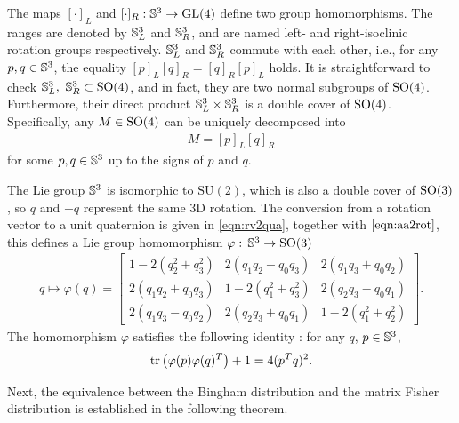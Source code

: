 The maps $[\cdot]_L$ and $[\cdot]_R: \mathbb{S}^3 \to \mathrm{GL}(4)$ define two group homomorphisms.
The ranges are denoted by $\mathbb{S}^3_L$ and $\mathbb{S}^3_R$, and are named left- and right-isoclinic rotation groups respectively.
$\mathbb{S}^3_L$ and $\mathbb{S}^3_R$ commute with each other, i.e., for any $p,q\in\mathbb{S}^3$, the equality $[p]_L[q]_R = [q]_R[p]_L$ holds.
It is straightforward to check $\mathbb{S}^3_L,\ \mathbb{S}^3_R \subset \mathrm{SO}(4)$, and in fact, they are two normal subgroups of $\mathrm{SO}(4)$.
Furthermore, their direct product $\mathbb{S}^3_L \times \mathbb{S}^3_R$ is a double cover of $\mathrm{SO}(4)$.
Specifically, any $M\in\mathrm{SO}(4)$ can be uniquely decomposed into
\begin{align}
	M = [p]_L[q]_R
\end{align}
for some $p,q\in\mathbb{S}^3$ up to the signs of $p$ and $q$.

The Lie group $\mathbb{S}^3$ is isomorphic to $\mathrm{SU}(2)$, which is also a double cover of $\mathrm{SO}(3)$, so $q$ and $-q$ represent the same 3D rotation.
The conversion from a rotation vector to a unit quaternion is given in \eqref{eqn:rv2qua}, together with $\eqref{eqn:aa2rot}$, this defines a Lie group homomorphism $\varphi:\, \mathbb{S}^3\to\mathrm{SO}(3)$
\begin{align} \label{eqn:SO3-Sph3}
	q \mapsto \varphi(q) =  \begin{bmatrix}
		1-2(q_2^2+q_3^2) & 2(q_1q_2-q_0q_3) & 2(q_1q_3+q_0q_2) \\
		2(q_1q_2+q_0q_3) & 1-2(q_1^2+q_3^2) & 2(q_2q_3-q_0q_1) \\
		2(q_1q_3-q_0q_2) & 2(q_2q_3+q_0q_1) & 1-2(q_1^2+q_2^2)
	\end{bmatrix}.
\end{align}
The homomorphism $\varphi$ satisfies the following identity \cite{prentice1986orientation}:
for any $q$, $p\in\mathbb{S}^3$,
\begin{align} \label{eqn:q_1^Tq_2}
	\mathrm{tr}\left( \varphi(p)\varphi(q)^T \right) + 1 = 4(p^Tq)^2.
\end{align}

Next, the equivalence between the Bingham distribution and the matrix Fisher distribution is established in the following theorem.

